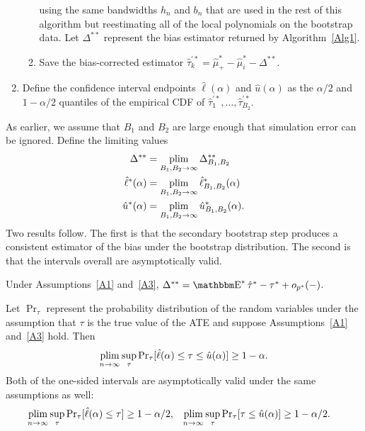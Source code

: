 \documentclass[12pt,fleqn]{article}
\begin{document}
\begin{algorithm}
\begin{enumerate}
\begin{enumerate}
\begin{equation*}
      \end{equation*}
      using the same bandwidths $h_n$ and $b_n$ that are used in the rest of
      this algorithm but reestimating all of the local polynomials on the
      bootstrap data. Let $\Delta^{**}$ represent the bias estimator returned
      by Algorithm~\ref{Alg1}.
    \item Save the bias-corrected estimator
      $\hat\tau_k^{\prime*} = \hat\mu_+^* - \hat\mu_i^* - \Delta^{**}$.
    \end{enumerate}
  \item Define the confidence interval endpoints $\hat\ell(\alpha)$ and
    $\hat u(\alpha)$ as the $\alpha/2$ and $1-\alpha/2$ quantiles of the
    empirical CDF of $\hat\tau_1^{\prime*},\dots,\hat\tau_{B_2}^{\prime*}$.
  \end{enumerate}
\end{algorithm}

As earlier, we assume that $B_1$ and $B_2$ are large enough that simulation
error can be ignored. Define the limiting values
\begin{align*}
\Delta^{**} &= \operatorname*{plim}_{B_1,B_2 \to \infty} \Delta^{**}_{B_1,B_2} \\
\hat\ell^*(\alpha) &= \operatorname*{plim}_{B_1,B_2 \to \infty} \hat\ell^*_{B_1,B_2}(\alpha) \\
\hat u^*(\alpha) &= \operatorname*{plim}_{B_1,B_2 \to \infty} \hat u^*_{B_1,B_2}(\alpha).
\end{align*}
Two results follow. The first is that the secondary bootstrap step produces
a consistent estimator of the bias under the bootstrap distribution. The
second is that the intervals overall are asymptotically valid.

\begin{lemma}\label{L2}
  Under Assumptions~\ref{A1} and~\ref{A3},
  $\Delta^{**} = \E^* \hat\tau^* - \tau^* + o_{p^*}(-)$.
\end{lemma}


\begin{theorem}\label{T1}
  Let $\Pr_\tau$ represent the probability distribution of the random variables
  under the assumption that $\tau$ is the true value of the ATE and suppose
  Assumptions~\ref{A1} and~\ref{A3} hold. Then
  \begin{equation}
    \label{eq:5}
    \operatorname*{plim}_{n \to \infty} \sup_\tau
    \operatorname{Pr}_\tau[\hat\ell(\alpha) \leq \tau \leq \hat u(\alpha)] \geq 1 - \alpha.
  \end{equation}
  Both of the one-sided intervals are asymptotically valid under the same
  assumptions as well:
  \begin{align}
    \operatorname*{plim}_{n \to \infty} \sup_\tau
    \operatorname{Pr}_\tau[\hat\ell(\alpha) \leq \tau ] &\geq 1 - \alpha / 2, &
    \operatorname*{plim}_{n \to \infty} \sup_\tau
    \operatorname{Pr}_\tau[\tau \leq \hat u(\alpha)] &\geq 1 - \alpha / 2.
  \end{align}
\end{theorem}
\end{document}
